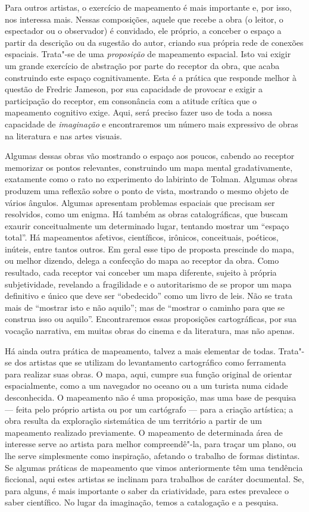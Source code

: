 Para outros artistas, o exercício de mapeamento é mais importante e, por
isso, nos interessa mais. Nessas composições, aquele que recebe a obra (o
leitor, o espectador ou o observador) é convidado, ele próprio, a
conceber o espaço a partir da descrição ou da sugestão do autor, criando
sua própria rede de conexões espaciais. Trata"-se de uma
\emph{proposição} de mapeamento espacial. Isto vai exigir um
grande exercício de abstração por parte do receptor da obra, que acaba
construindo este espaço cognitivamente. Esta é a prática que responde
melhor à questão de Fredric Jameson, por sua capacidade de provocar e
exigir a participação do receptor, em consonância com a atitude crítica
que o mapeamento cognitivo exige. Aqui, será preciso fazer uso de toda a
nossa capacidade de \emph{imaginação} e encontraremos um número mais
expressivo de obras na literatura e nas artes visuais.

Algumas dessas obras vão mostrando o espaço aos poucos, cabendo ao
receptor memorizar os pontos relevantes, construindo um mapa mental
gradativamente, exatamente como o rato no experimento do labirinto de
Tolman. Algumas obras produzem uma reflexão sobre o ponto de vista,
mostrando o mesmo objeto de vários ângulos. Algumas apresentam problemas
espaciais que precisam ser resolvidos, como um enigma. Há também as
obras catalográficas, que buscam exaurir conceitualmente um determinado
lugar, tentando mostrar um ``espaço total''. Há mapeamentos afetivos,
científicos, irônicos, conceituais, poéticos, inúteis, entre tantos
outros. Em geral esse tipo de proposta prescinde do mapa, ou melhor
dizendo, delega a confecção do mapa ao receptor da obra. Como resultado,
cada receptor vai conceber um mapa diferente, sujeito à própria
subjetividade, revelando a fragilidade e o autoritarismo de se propor um
mapa definitivo e único que deve ser ``obedecido'' como um livro de
leis. Não se trata mais de ``mostrar isto e não aquilo''; mas de
``mostrar o caminho para que se construa isso ou aquilo''. Encontraremos
essas proposições cartográficas, por sua vocação narrativa, em muitas
obras do cinema e da literatura, mas não apenas.

Há ainda outra prática de mapeamento, talvez a mais elementar de todas.
Trata"-se dos artistas que se utilizam do levantamento cartográfico como
ferramenta para realizar suas obras. O mapa, aqui, cumpre sua função
original de orientar espacialmente, como a um navegador no oceano ou a
um turista numa cidade desconhecida. O mapeamento não é uma proposição,
mas uma base de pesquisa --- feita pelo próprio artista ou por um
cartógrafo --- para a criação artística; a obra resulta da exploração
sistemática de um território a partir de um mapeamento realizado
previamente. O mapeamento de determinada área de interesse serve ao
artista para melhor compreendê"-la, para traçar um plano, ou lhe serve
simplesmente como inspiração, afetando o trabalho de formas distintas.
Se algumas práticas de mapeamento que vimos anteriormente têm uma
tendência ficcional, aqui estes artistas se inclinam para trabalhos de
caráter documental. Se, para alguns, é mais importante o saber da
criatividade, para estes prevalece o saber científico. No lugar da
imaginação, temos a catalogação e a pesquisa.

